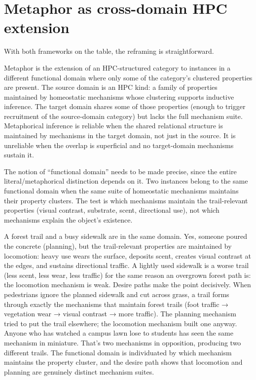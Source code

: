 \documentclass[12pt]{article}
\begin{document}
\section{Metaphor as cross-domain HPC extension}
\label{sec:reframing}

With both frameworks on the table, the reframing is straightforward.

Metaphor is the extension of an HPC-structured category to instances in a different functional domain where only some of the category's clustered properties are present. The source domain is an HPC kind: a family of properties maintained by homeostatic mechanisms whose clustering supports inductive inference. The target domain shares some of those properties (enough to trigger recruitment of the source-domain category) but lacks the full mechanism suite. Metaphorical inference is reliable when the shared relational structure is maintained by mechanisms in the target domain, not just in the source. It is unreliable when the overlap is superficial and no target-domain mechanisms sustain it.

The notion of \enquote{functional domain} needs to be made precise, since the entire literal/metaphorical distinction depends on it. Two instances belong to the same functional domain when the same suite of homeostatic mechanisms maintains their property clusters. The test is which mechanisms maintain the trail-relevant properties (visual contrast, substrate, scent, directional use), not which mechanisms explain the object's existence.

A forest trail and a busy sidewalk are in the same domain. Yes, someone poured the concrete (planning), but the trail-relevant properties are maintained by locomotion: heavy use wears the surface, deposits scent, creates visual contrast at the edges, and sustains directional traffic. A lightly used sidewalk is a worse trail (less scent, less wear, less traffic) for the same reason an overgrown forest path is: the locomotion mechanism is weak. Desire paths make the point decisively. When pedestrians ignore the planned sidewalk and cut across grass, a trail forms through exactly the mechanisms that maintain forest trails (foot traffic → vegetation wear → visual contrast → more traffic). The planning mechanism tried to put the trail elsewhere; the locomotion mechanism built one anyway. Anyone who has watched a campus lawn lose to students has seen the same mechanism in miniature. That's two mechanisms in opposition, producing two different trails. The functional domain is individuated by which mechanism maintains the property cluster, and the desire path shows that locomotion and planning are genuinely distinct mechanism suites.
\end{document}
